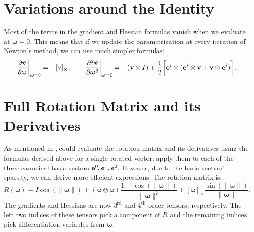 \documentclass[10pt]{article}
\providecommand{\norm}[1]{\lVert#1\rVert}
\providecommand{\cross}{\times}
\providecommand{\pder}[2]{\frac{\partial #1}{\partial #2}}
\renewcommand{\vec}[1]{{\bf #1}}
\newcommand\pr[1]{\prettyref{#1}}
\def\w{\boldsymbol{\omega}}
\def\wn{\norm{\w}}
\def\v{\vec{v}}
\def\e{\vec{e}}
\begin{document}
\section{Variations around the Identity}
\label{sec:around_identity}
Most of the terms in the gradient and Hessian formulas vanish when we evaluate at $\w = 0$. This means that if we update the
parametrization at every iteration of Newton's method, we can use much simpler formulas:
\begin{equation*}
\left.\pder{\tilde{\v}}{\w}\right|_{\w = 0} =
     - [\v]_\cross,
\quad \quad
\left.\frac{\partial^2 \tilde{\v}}{\partial \w^2}\right|_{\w = 0} =
-(\v \otimes I)
+ \left.\frac{1}{2} \middle[ \e^i \otimes (\e^i \otimes \v +  \v \otimes \e^i) \right].
\end{equation*}

\section{Full Rotation Matrix and its Derivatives}
As mentioned in \pr{sec:representation}, could evaluate the rotation matrix and
its derivatives using the formulas derived above for a single rotated vector:
apply them to each of the three canonical basis
vectors $\e^0, \e^1, \e^2$. However, due to the basis vectors' sparsity,
we can derive more efficient expressions. The rotation matrix is:
$$
R(\w) = I \cos(\wn) + (\w \otimes \w) \frac{1 - \cos(\wn)}{\wn^2} + [\w]_\cross \frac{\sin(\wn)}{\wn}.
$$
The gradients and Hessians are now $3^\text{rd}$ and $4^\text{th}$ order tensors, respectively. The left two
indices of these tensors pick a component of $R$ and the remaining indices pick differentiation variables
from $\w$.
\end{document}
